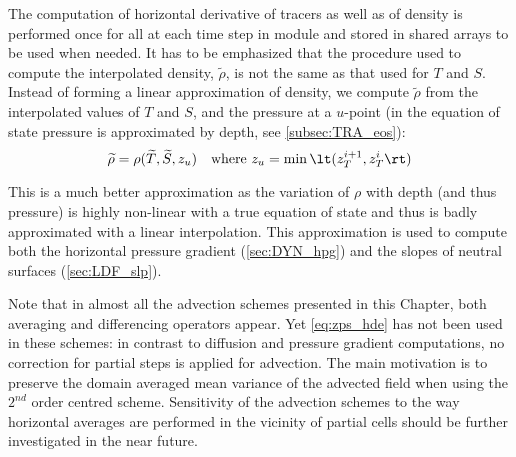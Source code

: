 \documentclass[../main/NEMO_manual]{subfiles}
\begin{document}
The computation of horizontal derivative of tracers as well as of density is performed once for all at
each time step in  module and stored in shared arrays to be used when needed.
It has to be emphasized that the procedure used to compute the interpolated density, $\widetilde \rho$,
is not the same as that used for $T$ and $S$.
Instead of forming a linear approximation of density, we compute $\widetilde \rho$ from the interpolated values of
$T$ and $S$, and the pressure at a $u$-point
(in the equation of state pressure is approximated by depth, see \autoref{subsec:TRA_eos}): 
\[
  \widetilde \rho = \rho (\widetilde T,\widetilde S,z_u) \quad \text{where~} z_u = \min \lt( z_T^{i + 1},z_T^i \rt)
\]

This is a much better approximation as the variation of $\rho$ with depth (and thus pressure)
is highly non-linear with a true equation of state and thus is badly approximated with a linear interpolation.
This approximation is used to compute both the horizontal pressure gradient (\autoref{sec:DYN_hpg}) and
the slopes of neutral surfaces (\autoref{sec:LDF_slp}).

Note that in almost all the advection schemes presented in this Chapter,
both averaging and differencing operators appear.
Yet \autoref{eq:zps_hde} has not been used in these schemes:
in contrast to diffusion and pressure gradient computations,
no correction for partial steps is applied for advection.
The main motivation is to preserve the domain averaged mean variance of the advected field when
using the $2^{nd}$ order centred scheme.
Sensitivity of the advection schemes to the way horizontal averages are performed in the vicinity of
partial cells should be further investigated in the near future.

\biblio

\pindex
\end{document}
